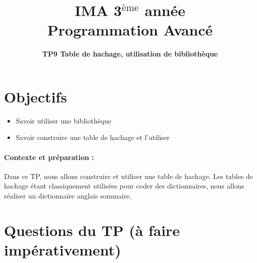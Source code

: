 \documentclass[final, pdftex, a4paper, openbib, ]{article}
\title{IMA 3$^{\mbox{\`eme}}$ année\\ Programmation Avancé
}
\author{\huge \textbf{TP9 Table de hachage, utilisation de bibliothèque}}
\date{}
\let\OldTexttt\texttt
\renewcommand{\texttt}[1]{\OldTexttt{\hl{#1}}}
\begin{document}
\posttitle{\par\end{center}}
\setlength{\droptitle}{-45pt}
\maketitle

\vspace{-1.7cm}
\section{Objectifs}

\begin{itemize}
	\item Savoir utiliser une bibliothèque
	\item Savoir construire une table de hachage et l'utiliser
\end{itemize}


\paragraph{Contexte et préparation : }
Dans ce TP, nous allons construire et utiliser une table de hachage. Les tables de hachage étant classiquement utilisées pour coder des dictionnaires, nous allons réaliser un dictionnaire anglais sommaire.


\section{Questions du TP \large (à faire impérativement)}
\end{document}
